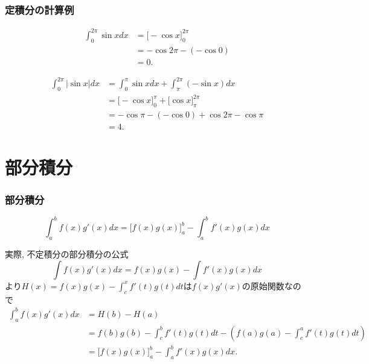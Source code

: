 \begin{frame}
\frametitle{定積分の計算例}


\begin{align*}
\int_0^{2\pi} \sin x dx & = \big[ -\cos x\big]_0^{2\pi} \\
& = -\cos 2\pi - (- \cos 0) \\
& =0. 
\end{align*}

\begin{align*}
\int_0^{2\pi} |\sin x| dx & = \int_0^{\pi} \sin x dx + \int_\pi^{2\pi} (-\sin x) dx \\
& = \big[ -\cos x\big]_0^{\pi} +  \big[ \cos x\big]_\pi^{2\pi} \\
& = -\cos \pi - (- \cos 0) + \cos 2\pi - \cos \pi \\
& =4. 
\end{align*}

\end{frame}





\section{部分積分}

\begin{frame}
\frametitle{部分積分}

\vspace{-2.7mm}

\begin{Thm}[部分積分の公式] \vspace{-1mm}
$$
\int_a^b f(x)g'(x)dx = \big[f(x)g(x)\big]_a^b - \int_a^b f'(x)g(x)dx
$$
\end{Thm} \vspace{-0.5mm}
実際, 不定積分の部分積分の公式
$$
\int f(x)g'(x)dx = f(x)g(x) - \int f'(x)g(x)dx
$$
より$H(x)=f(x)g(x) - \int_c^x f'(t)g(t)dt$は$ f(x)g'(x)$の原始関数なので \vspace{-1mm}
\begin{align*}
\int_a^b f(x)g'(x)dx &= H(b)-H(a) \\
& = f(b)g(b) - \int_c^b f'(t)g(t)dt - (f(a)g(a) - \int_c^a f'(t)g(t)dt) \\
& = \big[f(x)g(x)\big]_a^b - \int_a^b f'(x)g(x)dx. 
\end{align*}


\end{frame}

